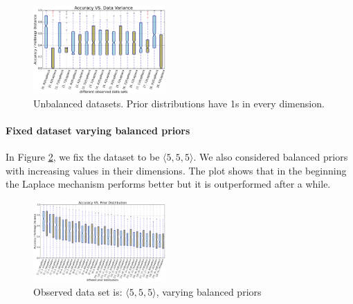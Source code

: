 \documentclass[sigconf, anonymous]{acmart}
\begin{document}
\begin{figure}[ht]
\centering
\includegraphics[width=0.45\textwidth]{accuracy_vs_mean_1_1.eps}
\caption{Unbalanced datasets. Prior distributions have 1s in every dimension.}
\label{fig_vs_variance}
\end{figure}




\paragraph{Fixed dataset varying balanced priors}
\label{subsubsec_vs_prior}
In Figure \ref{fig_vs_prior}, we fix the dataset to be $\langle 5,5,5\rangle$.
We also considered balanced priors with increasing values in their dimensions.
The plot shows that in the beginning the Laplace mechanism performs better but
it is outperformed after a while.
\begin{figure}[ht]
\centering
\includegraphics[width=0.45\textwidth]{accuracy_vs_prior_5_5_5.eps}
\caption{Observed data set is: $\langle 5,5,5\rangle$, varying balanced priors}
\label{fig_vs_prior}
\end{figure}






\end{document}
